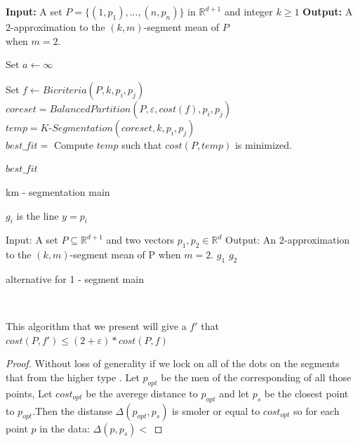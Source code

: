 \documentclass[12pt]{llncs}
\begin{document}
\begin{algorithm}
\begin{algorithmic}
\STATE \textbf{Input:} A set $P = \lbrace(1,p_1),...,(n,p_n)\rbrace$ in $ \mathbb{R}^{d+1}$
and integer $k\geq1$
\STATE \textbf{Output:} A $2$-approximation to the $(k,m)$-segment mean of $P$\\ when $m=2$.
 
Set $a\gets \infty$

\STATE 
Set $f \gets Bicriteria(P,k,p_i,p_j)$ \\
$coreset = BalancedPartition(P,\varepsilon,cost(f),p_i,p_j)$\\
$temp=K$-$Segmentation(coreset,k,p_i,p_j)$\\
\STATE $best\_fit = $ Compute $temp$ such that $cost(P,temp)$ is minimized.

\ENDFOR

\RETURN $best\_fit$



\caption{km - segmentation main}

\end{algorithmic}
\end{algorithm}
$g_i$ is the line $y= p_i$
\begin{algorithm}
\begin{algorithmic}
\STATE Input: A set $P\subseteq \mathbb{R}^{d+1}$
and two vectors $p_1,p_2 \in \mathbb{R}^d$
\STATE Output: An $2$-approximation to the $(k,m)$-segment mean of P when $m=2$.
\RETURN $g_1$
\ELSE
\RETURN $g_2$
\ENDIF 

\caption{alternative for 1 - segment main}

\end{algorithmic}
\end{algorithm}\\

\begin{theorem}
This algorithm that we present will give a $f'$ that 
$cost(P,f')\leq (2+\varepsilon)*cost(P,f)$
\\


\end{theorem}
\begin{proof}
Without loss of generality
if we lock on all of the dots on the segments that from the higher type .
Let $p_{opt}$ be the men of the corresponding of all those points, Let $cost_{opt}$ be the averege distance to $p_{opt}$ and let $p_{s}$ be the closest point to $p_{opt}$.Then the distanse $\Delta(p_{opt},p_s)$ is smoler or equal to $cost_{opt}$ so for each point $p$ in the data: $\Delta(p,p_s)<$

\end{proof}
\end{document}
